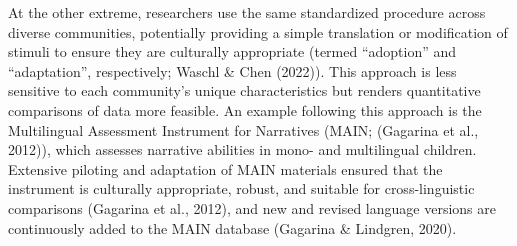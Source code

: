 \documentclass[
  man,floatsintext]{apa7}
\begin{document}
At the other extreme, researchers use the same standardized procedure across diverse communities, potentially providing a simple translation or modification of stimuli to ensure they are culturally appropriate (termed ``adoption'' and ``adaptation'', respectively; Waschl \& Chen (2022)).
This approach is less sensitive to each community's unique characteristics but renders quantitative comparisons of data more feasible.
An example following this approach is the Multilingual Assessment Instrument for Narratives (MAIN; (Gagarina et al., 2012)), which assesses narrative abilities in mono- and multilingual children.
Extensive piloting and adaptation of MAIN materials ensured that the instrument is culturally appropriate, robust, and suitable for cross-linguistic comparisons (Gagarina et al., 2012), and new and revised language versions are continuously added to the MAIN database (Gagarina \& Lindgren, 2020).
\end{document}
